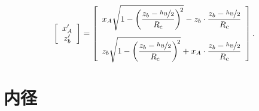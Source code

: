 \begin{subequations}
\begin{align*}
    \left[
      \begin{array}{c}
        x'_A\\
        z'_b
      \end{array}
    \right]
    = \left[
      \begin{array}{c}
        \displaystyle
        x_A\sqrt{1-\left(\frac{z_b-\nicefrac{h_\mathrm B}2}{R_\mathrm c}\right)^{\!2}}
        -z_b\cdot\frac{z_b-\nicefrac{h_\mathrm B}2}{R_\mathrm c}\\[15pt]
        \displaystyle
        z_b\sqrt{1-\left(\frac{z_b-\nicefrac{h_\mathrm B}2}{R_\mathrm c}\right)^{\!2}}
        +x_A\cdot\frac{z_b-\nicefrac{h_\mathrm B}2}{R_\mathrm c}
      \end{array}
    \right].
\end{align*}
\end{subequations}




\chapter{内径}




